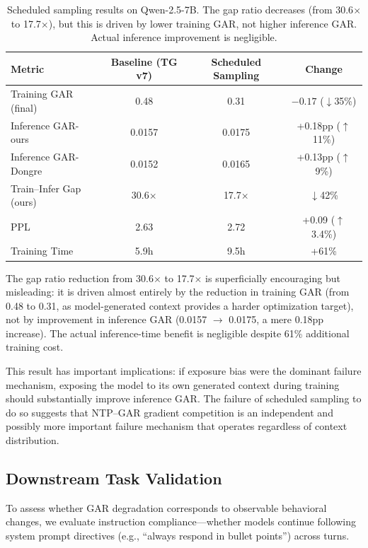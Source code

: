 \documentclass[11pt,a4paper]{article}
\begin{document}
\begin{table}[h]
\centering
\small
\caption{Scheduled sampling results on Qwen-2.5-7B. The gap ratio decreases (from 30.6$\times$ to 17.7$\times$), but this is driven by lower training GAR, not higher inference GAR. Actual inference improvement is negligible.}
\label{tab:mitigation}
\begin{tabular}{lccc}
\toprule
\textbf{Metric} & \textbf{Baseline (TG v7)} & \textbf{Scheduled Sampling} & \textbf{Change} \\
\midrule
Training GAR (final) & 0.48 & 0.31 & $-0.17$ ($\downarrow$35\%) \\
Inference GAR-ours & 0.0157 & 0.0175 & +0.18pp ($\uparrow$11\%) \\
Inference GAR-Dongre & 0.0152 & 0.0165 & +0.13pp ($\uparrow$9\%) \\
Train--Infer Gap (ours) & 30.6$\times$ & 17.7$\times$ & $\downarrow$42\% \\
PPL & 2.63 & 2.72 & +0.09 ($\uparrow$3.4\%) \\
Training Time & 5.9h & 9.5h & +61\% \\
\bottomrule
\end{tabular}
\end{table}

The gap ratio reduction from 30.6$\times$ to 17.7$\times$ is superficially encouraging but misleading: it is driven almost entirely by the reduction in training GAR (from 0.48 to 0.31, as model-generated context provides a harder optimization target), not by improvement in inference GAR (0.0157 $\to$ 0.0175, a mere 0.18pp increase).
The actual inference-time benefit is negligible despite 61\% additional training cost.

This result has important implications: if exposure bias were the dominant failure mechanism, exposing the model to its own generated context during training should substantially improve inference GAR.
The failure of scheduled sampling to do so suggests that NTP--GAR gradient competition is an independent and possibly more important failure mechanism that operates regardless of context distribution.

\subsection{Downstream Task Validation}
\label{sec:downstream}

To assess whether GAR degradation corresponds to observable behavioral changes, we evaluate instruction compliance---whether models continue following system prompt directives (e.g., ``always respond in bullet points'') across turns.
\end{document}
